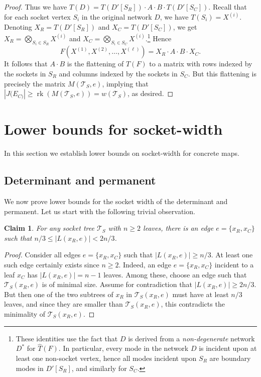 \documentclass[11pt]{article}
\numberwithin{equation}{section}
\newtheorem{claim}[theorem]{Claim}
\theoremstyle{definition}
\theoremstyle{plain}
\newcommand{\rk}{\ensuremath{\operatorname{rk}}}
\newcommand{\ts}{\ensuremath{\mathcal{T}_S}}
\begin{document}
\begin{proof}
  Thus we have $T(D) = T(D'[S_R]) \cdot A \cdot
  B \cdot T(D'[S_C])$.  Recall that for each
  socket vertex $S_i$ in the original network $D$, we have $T(S_i) = X^{(i)}$.  Denoting $X_R = T(D'[S_R])$ and $X_C = T(D'[S_C])$, we get $X_R = \bigotimes_{S_i \in S_R} X^{(i)}$ and $X_C = \bigotimes_{S_i \in S_C} X^{(i)}$.\footnote{These identities use the fact that $D$ is derived from a \emph{non-degenerate} network $D^*$ for $\hat{T}(F)$.  In particular, every mode in the network $D$ is incident upon at least one non-socket vertex, hence all modes incident upon $S_R$ are boundary modes in $D'[S_R]$, and similarly for $S_C$.}
    Hence
  \[
  F(X^{(1)}, X^{(2)}, \ldots, X^{(\ell)}) = X_R \cdot A \cdot B \cdot X_C.
  \]
  It follows that $A \cdot B$ is the flattening of $T(F)$
  to a matrix with rows indexed by the sockets in $S_R$ and columns
  indexed by the sockets in $S_C$.  But this flattening is precisely
  the matrix $M(\ts, e)$, implying that $|J(E_{C)}| \ge \rk(M(\ts, e)) =
  w(\ts)$, as desired.
\end{proof}


\section{Lower bounds for socket-width}
\label{sec:socket-width lower bound}

In this section we establish lower bounds on socket-width for concrete
maps.

\subsection{Determinant and permanent}
\label{sec:det and per socket width lower bounds}
\label{sec:permanent barrier}

We now prove lower bounds for the socket width of the determinant and
permanent.
Let us start with the following trivial observation.

\begin{claim}
  \label{claim:balanced edge}
  For any socket tree $\ts$ with $n \ge 2$ leaves, there is an edge $e = \{x_R, x_C\}$
  such that $n/3 \le |L(x_R, e)| < 2n/3$.
\end{claim}

\begin{proof}
  Consider all edges $e = \{x_R, x_C\}$ such that $|L(x_R, e)| \ge n/3$.  At
  least one such edge certainly exists since $n \ge 2$. Indeed, an edge
  $e = \{x_R, x_C\}$ incident to a leaf $x_C$ has $|L(x_R, e)| = n-1$
  leaves.  Among these, choose an edge such that $\ts(x_R, e)$ is of minimal size.
%
  Assume for contradiction that $|L(x_R, e)| \ge 2n/3$.  But then one of
  the two subtrees of $x_R$ in $\ts(x_R, e)$ must have at least $n/3$
  leaves, and since they are smaller than $\ts(x_R, e)$, this contradicts
  the minimality of $\ts(x_R, e)$.
\end{proof}
\end{document}

